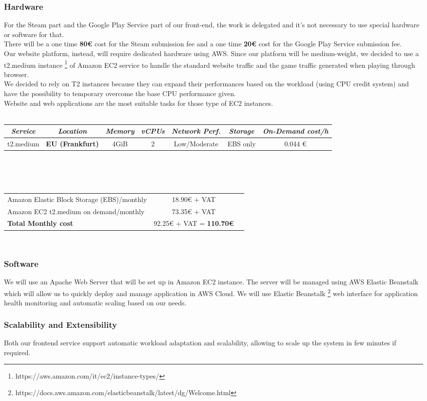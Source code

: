 \subsubsection{Hardware}
\label{section:frontend_hardware}
For the Steam part and the Google Play Service part of our front-end, the work is delegated and it's not necessary to use special hardware or software for that.\\
There will be a one time \textbf{80€} cost for the Steam submission fee and a one time \textbf{20€} cost for the Google Play Service submission fee.\\
Our website platform, instead, will require dedicated hardware using AWS. Since our platform will be medium-weight, we decided to use a t2.medium instance \footnote{https://aws.amazon.com/it/ec2/instance-types/} of Amazon EC2 service to handle the standard website traffic and the game traffic generated when playing through browser.\\
We decided to rely on T2 instances because they can expand their performances based on the workload (using CPU credit system) and have the possibility to temporary overcome the base CPU performance given.\\
Website and web applications are the most suitable tasks for those type of EC2 instances.\\
\\
\begin{tabular}{|c|c|c|c|c|c|c|}
\hline
\textit{Service} & \textit{Location} & \textit{Memory} & \textit{vCPUs} & \textit{Network Perf.} & \textit{Storage} & \textit{On-Demand cost/h}\\
\hline
t2.medium &	\textbf{EU (Frankfurt)} & 4GiB &	2 &	Low/Moderate & EBS only & 0.044 €\\
\hline
\end{tabular}
\\\\\\
\begin{tabular}{lcr}
Amazon Elastic Block Storage (EBS)/monthly  & 18.90€ + VAT \\
Amazon EC2 t2.medium on demand/monthly & 73.35€ + VAT \\
\hline
\textbf{Total Monthly cost} & 92.25€ + VAT = \textbf{110.70€}
\end{tabular}
\\
\subsubsection{Software}
We will use an Apache Web Server that will be set up in Amazon EC2 instance. The server will be managed using AWS Elastic Beanstalk which will allow us to quickly deploy and manage application in AWS Cloud. We will use Elastic Beanstalk \footnote{https://docs.aws.amazon.com/elasticbeanstalk/latest/dg/Welcome.html} web interface for application health monitoring and automatic scaling based on our needs.

\subsubsection{Scalability and Extensibility}
Both our frontend service support automatic workload adaptation and scalability, allowing to scale up the system in few minutes if required. \\
